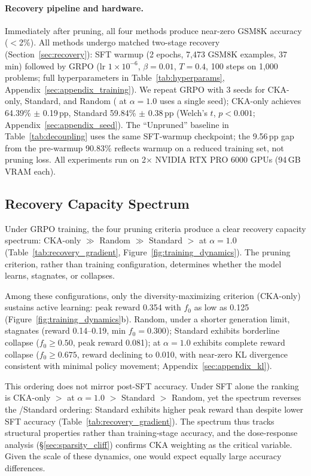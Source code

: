 \paragraph{Recovery pipeline and hardware.}
Immediately after pruning, all four methods produce near-zero GSM8K accuracy ($<$2\%).
All methods undergo matched two-stage recovery (Section~\ref{sec:recovery}): SFT warmup (2 epochs, 7{,}473 GSM8K examples, 37 min) followed by GRPO (lr $1{\times}10^{-6}$, $\beta{=}0.01$, $T{=}0.4$, 100 steps on 1{,}000 problems; full hyperparameters in Table~\ref{tab:hyperparams}, Appendix~\ref{sec:appendix_training}).
We repeat GRPO with 3 seeds for CKA-only, Standard, and Random (\rasp{} at $\alpha{=}1.0$ uses a single seed); CKA-only achieves 64.39\% $\pm$ 0.19\,pp, Standard 59.84\% $\pm$ 0.38\,pp (Welch's $t$, $p{<}0.001$; Appendix~\ref{sec:appendix_seed}).
The ``Unpruned'' baseline in Table~\ref{tab:decoupling} uses the same SFT-warmup checkpoint; the 9.56\,pp gap from the pre-warmup 90.83\% reflects warmup on a reduced training set, not pruning loss.
All experiments run on 2$\times$ NVIDIA RTX PRO 6000 GPUs (94\,GB VRAM each).


\subsection{Recovery Capacity Spectrum}
\label{sec:recovery_gradient}

Under GRPO training, the four pruning criteria produce a clear recovery capacity spectrum: CKA-only $\gg$ Random $\gg$ Standard $>$ \rasp{} at $\alpha{=}1.0$ (Table~\ref{tab:recovery_gradient}, Figure~\ref{fig:training_dynamics}).
The pruning criterion, rather than training configuration, determines whether the model learns, stagnates, or collapses.

Among these configurations, only the diversity-maximizing criterion (CKA-only) sustains active learning: peak reward 0.354 with $f_0$ as low as 0.125 (Figure~\ref{fig:training_dynamics}b).
Random, under a shorter generation limit, stagnates (reward 0.14--0.19, min $f_0 = 0.300$); Standard exhibits borderline collapse ($f_0 \geq 0.50$, peak reward 0.081); \rasp{} at $\alpha{=}1.0$ exhibits complete reward collapse ($f_0 \geq 0.675$, reward declining to 0.010, with near-zero KL divergence consistent with minimal policy movement; Appendix~\ref{sec:appendix_kl}).

This ordering does not mirror post-SFT accuracy.
\label{sec:sft_gradient}
Under SFT alone the ranking is CKA-only $>$ \rasp{} at $\alpha{=}1.0$ $>$ Standard $>$ Random, yet the spectrum reverses the \rasp{}/Standard ordering: Standard exhibits higher peak reward than \rasp{} despite lower SFT accuracy (Table~\ref{tab:recovery_gradient}).
The spectrum thus tracks structural properties rather than training-stage accuracy, and the dose-response analysis (\S\ref{sec:sparsity_cliff}) confirms CKA weighting as the critical variable.
Given the scale of these dynamics, one would expect equally large accuracy differences.


